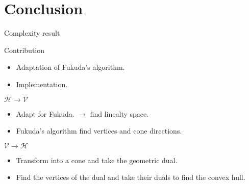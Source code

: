 \section{Conclusion}
\begin{frame}{Complexity result}
\begin{block}{Contribution}
\begin{itemize}
\item Adaptation of Fukuda's algorithm.
\item Implementation.
\end{itemize}
\end{block}

\begin{block}{$\mathcal{H}\rightarrow\mathcal{V}$}
\begin{itemize}
\item Adapt for Fukuda. $\rightarrow$ find linealty space.
\item Fukuda's algorithm find vertices and cone directions.
\end{itemize}
\end{block}


\begin{block}{$\mathcal{V}\rightarrow\mathcal{H}$}
\begin{itemize}
\item Transform into a cone and take the geometric dual.
\item Find the vertices of the dual and take their duals to find the convex hull.
\end{itemize}
\end{block}
\end{frame}



